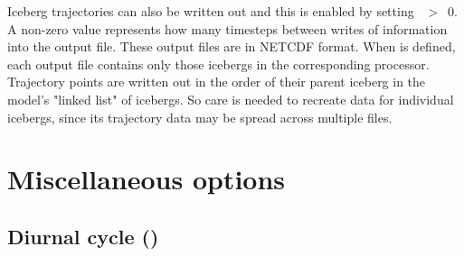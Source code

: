 Iceberg trajectories can also be written out and this is enabled by setting ~$>$~0.
A non-zero value represents how many timesteps between writes of information into the output file.
These output files are in NETCDF format.
When  is defined, each output file contains only those icebergs in the corresponding processor.
Trajectory points are written out in the order of their parent iceberg in the model's "linked list" of icebergs.
So care is needed to recreate data for individual icebergs, since its trajectory data may be spread across
multiple files.


\section{Miscellaneous options}
\label{SBC_misc}

\subsection   [Diurnal  cycle (\textit{sbcdcy})]
			{Diurnal cycle ()}
\label{SBC_dcy}

